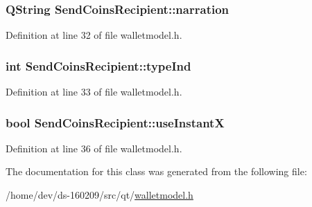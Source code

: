 \subsubsection[{narration}]{\setlength{\rightskip}{0pt plus 5cm}Q\+String Send\+Coins\+Recipient\+::narration}\label{class_send_coins_recipient_a3b07492ab64678b45cc5b44cea1090ca}


Definition at line 32 of file walletmodel.\+h.

\hypertarget{class_send_coins_recipient_aa7f64542aa7cfe5cfc4fe62a8488eb7e}{}
\subsubsection[{type\+Ind}]{\setlength{\rightskip}{0pt plus 5cm}int Send\+Coins\+Recipient\+::type\+Ind}\label{class_send_coins_recipient_aa7f64542aa7cfe5cfc4fe62a8488eb7e}


Definition at line 33 of file walletmodel.\+h.

\hypertarget{class_send_coins_recipient_a1fc33af0a7bde812bcd03c0cdf514bd1}{}
\subsubsection[{use\+Instant\+X}]{\setlength{\rightskip}{0pt plus 5cm}bool Send\+Coins\+Recipient\+::use\+Instant\+X}\label{class_send_coins_recipient_a1fc33af0a7bde812bcd03c0cdf514bd1}


Definition at line 36 of file walletmodel.\+h.



The documentation for this class was generated from the following file\+:\begin{DoxyCompactItemize}
\item 
/home/dev/ds-\/160209/src/qt/\hyperlink{walletmodel_8h}{walletmodel.\+h}\end{DoxyCompactItemize}
